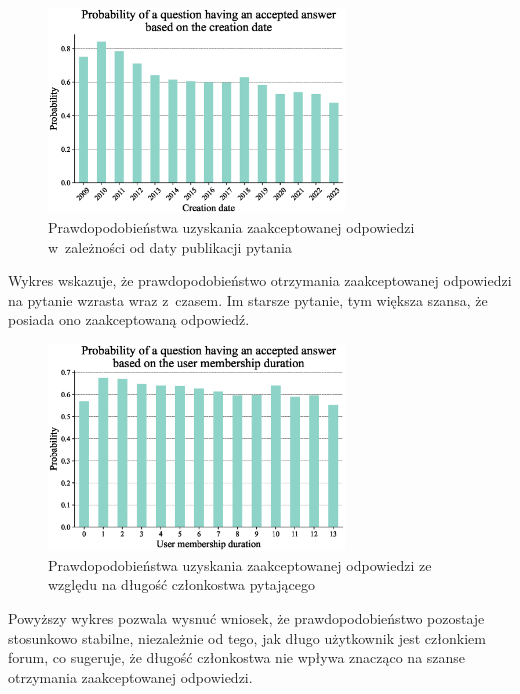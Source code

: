 \documentclass[12pt]{article}
\begin{document}
	\begin{figure}[H]
		\centering
		\includegraphics[width=0.7\textwidth]{question_creation_date}
		\caption{Prawdopodobieństwa uzyskania zaakceptowanej odpowiedzi w~zależności od daty publikacji pytania}
		\label{fig:prawdopodobienstwa-uzyskania-odpowiedzi-data}
	\end{figure}
	Wykres wskazuje, że prawdopodobieństwo otrzymania zaakceptowanej odpowiedzi na pytanie wzrasta wraz z~czasem. Im starsze pytanie, tym większa szansa, że posiada ono zaakceptowaną odpowiedź.
	
	\begin{figure}[H]
		\centering
		\includegraphics[width=0.7\textwidth]{user_experience}
		\caption{Prawdopodobieństwa uzyskania zaakceptowanej odpowiedzi ze względu na długość członkostwa pytającego}
		\label{fig:prawdopodobienstwa-uzyskania-odpowiedzi-czlonkostwo}
	\end{figure}
	Powyższy wykres pozwala wysnuć wniosek, że prawdopodobieństwo pozostaje stosunkowo stabilne, niezależnie od tego, jak długo użytkownik jest członkiem forum, co sugeruje, że długość członkostwa nie wpływa znacząco na szanse otrzymania zaakceptowanej odpowiedzi.
	
\end{document}
